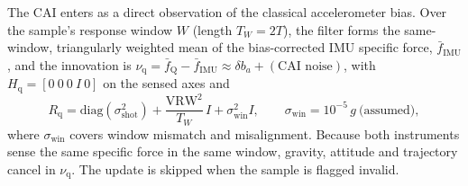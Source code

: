 \documentclass[journal]{IEEEtran}
\begin{document}
The CAI enters as a direct observation of the classical accelerometer bias. Over the sample's response
window $W$ (length $T_W = 2T$), the filter forms the same-window, triangularly weighted mean of the
bias-corrected IMU specific force, $\bar f_{\mathrm{IMU}}$, and the innovation is
$\nu_{\mathrm{q}} = \bar f_{\mathrm{Q}} - \bar f_{\mathrm{IMU}} \approx \delta b_a + (\text{CAI noise})$,
with $H_{\mathrm{q}} = [0\ 0\ 0\ I\ 0]$ on the sensed axes and
\begin{equation}
R_{\mathrm{q}} = \mathrm{diag}(\sigma_{\mathrm{shot}}^2) + \frac{\mathrm{VRW}^2}{T_W}\,I + \sigma_{\mathrm{win}}^2 I,
\qquad \sigma_{\mathrm{win}} = 10^{-5}\,g\ \text{(assumed)},
\label{eq:rq}
\end{equation}
where $\sigma_{\mathrm{win}}$ covers window mismatch and misalignment. Because both instruments sense the
same specific force in the same window, gravity, attitude and trajectory cancel in $\nu_{\mathrm{q}}$. The
update is skipped when the sample is flagged invalid.
\end{document}
